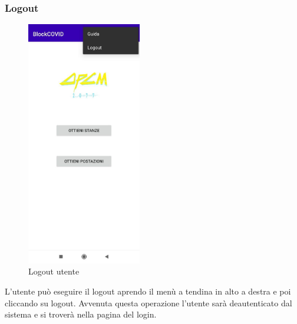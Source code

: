 	\subsubsection{Logout}
	\begin{figure}[H]
		\centering
		\includegraphics[width=5cm]{res/images/menuATendinaAddetto.png}
		\caption{Logout utente}
	\end{figure}
	L'utente può eseguire il logout aprendo il menù a tendina in alto a destra e poi cliccando su logout. Avvenuta questa operazione l'utente sarà deautenticato dal sistema e si troverà nella pagina del login.
	
